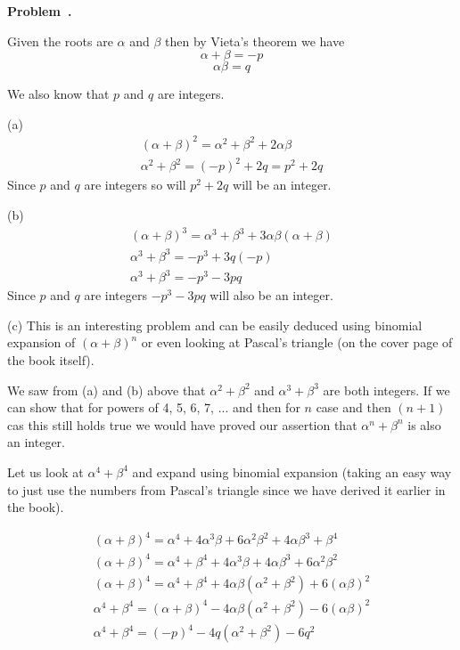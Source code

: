\documentclass[10pt]{article}
\newcounter{problem}
\newenvironment{problem}[1][]{
  \refstepcounter{problem}
  \par\noindent\textbf{Problem~\theproblem. #1}\par
  \vspace{0.5em}
}{\vspace{1em}}
\begin{document}
\begin{problem} %

  Given the roots are $\alpha$ and $\beta$ then by Vieta's theorem we have 
  \[
  \alpha + \beta = -p
  \]
  \[
  \alpha\beta = q
  \]

  We also know that $p$ and $q$ are integers.

  (a)
  \begin{gather*}
    (\alpha + \beta)^2 = \alpha^2 + \beta^2 + 2\alpha\beta\\
    \alpha^2 + \beta^2 = (-p)^2 + 2q = p^2 + 2q
  \end{gather*}
  Since $p$ and $q$ are integers so will $p^2 + 2q$ will be an integer.

  (b)
  \begin{gather*}
    (\alpha + \beta)^3 = \alpha^3 + \beta^3 + 3\alpha\beta(\alpha + \beta)\\
    \alpha^3 + \beta^3 = -p^3 + 3q(-p)\\
    \alpha^3 + \beta^3 = -p^3 - 3pq
  \end{gather*}
  Since $p$ and $q$ are integers $-p^3 - 3pq$ will also be an integer.

  (c)
  This is an interesting problem and can be easily deduced using binomial expansion of $(\alpha + \beta)^n$ or even looking at 
  Pascal's triangle (on the cover page of the book itself).

  We saw from (a) and (b) above that $\alpha^2 + \beta^2$ and $\alpha^3 + \beta^3$ are both integers. If we can show that for powers of 4, 5, 6, 7, ... and then for $n$ case and then $(n + 1)$ cas this still holds 
  true we would have proved our assertion that $\alpha^n + \beta^n$ is also an integer. 

  Let us look at $\alpha^4 + \beta^4$ and expand using binomial expansion (taking an easy way to just use the numbers from Pascal's triangle since we have derived it earlier in the book).

  \begin{gather*}
    (\alpha + \beta)^4 = \alpha^4 + 4\alpha^3\beta + 6\alpha^2\beta^2 + 4\alpha\beta^3 + \beta^4\\
    (\alpha + \beta)^4 = \alpha^4 + \beta^4 + 4\alpha^3\beta + 4\alpha\beta^3 + 6\alpha^2\beta^2\\
    (\alpha + \beta)^4 = \alpha^4 + \beta^4 + 4\alpha\beta (\alpha^2 + \beta^2) + 6(\alpha\beta)^2\\
    \alpha^4 + \beta^4 = (\alpha + \beta)^4 - 4\alpha\beta (\alpha^2 + \beta^2) - 6(\alpha\beta)^2\\
    \alpha^4 + \beta^4 = (-p)^4 - 4q (\alpha^2 + \beta^2) - 6q^2\\
  \end{gather*}


\end{problem}
\end{document}
